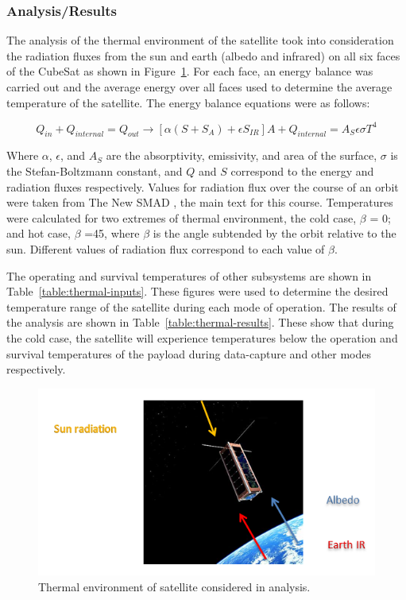 \documentclass[12pt]{article}
\begin{document}
\subsubsection{Analysis/Results}

The analysis of the thermal environment of the satellite took into consideration the radiation fluxes from the sun and earth (albedo and infrared) on all six faces of the CubeSat as shown in Figure~\ref{fig:thermal-environment}. For each face, an energy balance was carried out and the average energy over all faces used to determine the average temperature of the satellite. The energy balance equations were as follows:

\begin{equation}
Q_{in} + Q_{internal} = Q_{out} \rightarrow [\alpha(S + S_A) + \epsilon S_{IR}] A + Q_{internal} = A_S \epsilon \sigma T^4
\label{eq:thermal-balance}
\end{equation}

Where $\alpha$, $\epsilon$, and $A_S$ are the absorptivity, emissivity, and area of the surface, $\sigma$ is the Stefan-Boltzmann constant, and $Q$ and $S$ correspond to the energy and radiation fluxes respectively. Values for radiation flux over the course of an orbit were taken from The New SMAD \cite[p.~688,~table~22-11]{SMAD}, the main text for this course. Temperatures were calculated for two extremes of thermal environment, the cold case, $\beta$ = 0; and hot case, $\beta$ =45, where $\beta$ is the angle subtended by the orbit relative to the sun.  Different values of radiation flux correspond to each value of $\beta$.

The operating and survival temperatures of other subsystems are shown in Table~\ref{table:thermal-inputs}. These figures were used to determine the desired temperature range of the satellite during each mode of operation. The results of the analysis are shown in Table~\ref{table:thermal-results}. These show that during the cold case, the satellite will experience temperatures below the operation and survival temperatures of the payload during data-capture and other modes respectively.

\begin{figure}[ht]%
\centering
\includegraphics{images/thermal-environment}%
\caption{Thermal environment of satellite considered in analysis.\cite{satnews}}%
\label{fig:thermal-environment}%
\end{figure}
\end{document}
